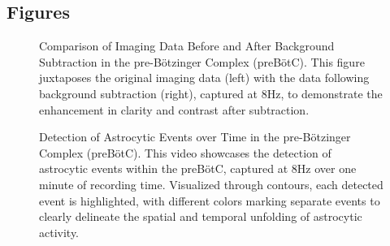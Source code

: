 \documentclass[utf8]{frontiers_suppmat} %
\begin{document}
    \subsection{Figures}

    \begin{figure}[htbp]
        \caption{ Comparison of Imaging Data Before and After Background Subtraction in the pre-Bötzinger Complex (preBötC). This figure juxtaposes the original imaging data (left) with the data following background subtraction (right), captured at 8Hz, to demonstrate the enhancement in clarity and contrast after subtraction.}
        \label{fig:subtraction-results}
    \end{figure}

    \begin{figure}[htbp]
        \caption{ Detection of Astrocytic Events over Time in the pre-Bötzinger Complex (preBötC). This video showcases the detection of astrocytic events within the preBötC, captured at 8Hz over one minute of recording time. Visualized through contours, each detected event is highlighted, with different colors marking separate events to clearly delineate the spatial and temporal unfolding of astrocytic activity.}
        \label{fig:detection-results}
    \end{figure}

\end{document}
